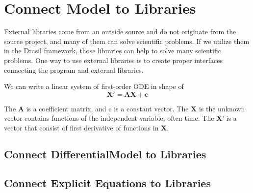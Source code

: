 \chapter{Connect Model to Libraries}
External libraries come from an outside source and do not originate from the source project, and many of them can solve scientific problems. If we utilize them in the Drasil framework, those libraries can help to solve many scientific problems. One way to use external libraries is to create proper interfaces connecting the program and external libraries.

We can write a linear system of first-order ODE in shape of 
\begin{equation} \label{eq_foode}
    \boldsymbol{X}' = \boldsymbol{AX} + \boldsymbol{c}
\end{equation}

The \textbf{A} is a coefficient matrix, and c is a constant vector. The \textbf{X} is the unknown vector contains functions of the independent variable, often time. The \textbf{X}' is a vector that consist of first derivative of functions in \textbf{X}.

\section{Connect DifferentialModel to Libraries}

\section{Connect Explicit Equations to Libraries}

